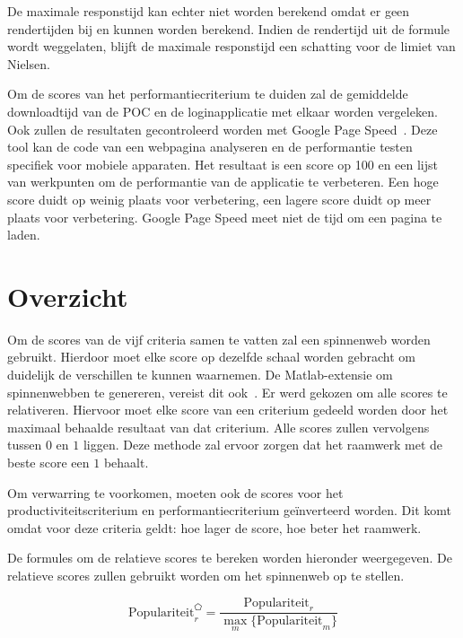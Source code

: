 De maximale responstijd kan echter niet worden berekend omdat er geen rendertijden bij \st{} en \lungo{} kunnen worden berekend.
Indien de rendertijd uit de formule wordt weggelaten,  blijft de maximale responstijd een schatting voor de limiet van Nielsen.

Om de scores van het performantiecriterium te duiden zal de gemiddelde downloadtijd van de POC en de loginapplicatie met elkaar worden vergeleken.
Ook zullen de resultaten gecontroleerd worden met Google Page Speed~\cite{Morgan2011}. 
Deze tool kan de code van een webpagina analyseren en de performantie testen specifiek voor mobiele apparaten.
Het resultaat is een score op 100 en een lijst van werkpunten om de performantie van de applicatie te verbeteren.
Een hoge score duidt op weinig plaats voor verbetering,  een lagere score duidt op meer plaats voor verbetering.
Google Page Speed meet niet de tijd om een pagina te laden.


\section{Overzicht}
\label{sec:vergelijking-spinnenweb}

Om de scores van de vijf criteria samen te vatten zal een spinnenweb worden gebruikt.
Hierdoor moet elke score op dezelfde schaal worden gebracht om duidelijk de verschillen te kunnen waarnemen.
De Matlab-extensie om spinnenwebben te genereren, vereist dit ook~\cite{Martti2007}.
Er werd gekozen om alle scores te relativeren.
Hiervoor moet elke score van een criterium gedeeld worden door het maximaal behaalde resultaat van dat criterium.
Alle scores zullen vervolgens tussen $0$ en $1$ liggen.
Deze methode zal ervoor zorgen dat het raamwerk met de beste score een $1$ behaalt.

Om verwarring te voorkomen, moeten ook de scores voor het productiviteitscriterium en performantiecriterium geïnverteerd worden.
Dit komt omdat voor deze criteria geldt:  hoe lager de score,  hoe beter het raamwerk.

De formules om de relatieve scores te bereken worden hieronder weergegeven.
De relatieve scores zullen gebruikt worden om het spinnenweb op te stellen.

\begin{equation}
  \text{Populariteit}_r^{\pentagon}=\frac{\text{Populariteit}_r}{\underset{m}{\max}\{\text{Populariteit}_m\}}
  \label{eq:rel-populariteit}
\end{equation}

